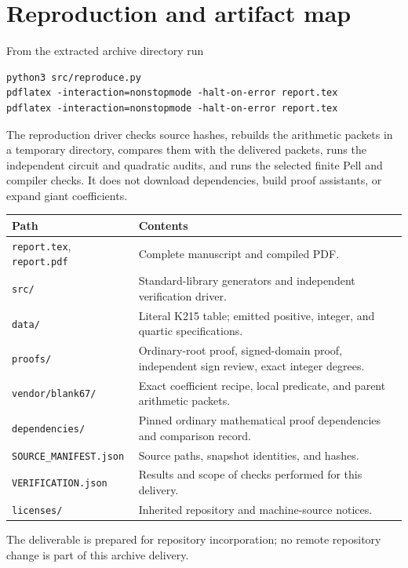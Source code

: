 \documentclass[11pt,a4paper]{article}
\theoremstyle{remark}\newtheorem{remark}[theorem]{Remark}
\newcommand{\src}[1]{\nolinkurl{#1}}
\begin{document}
\section{Reproduction and artifact map}
From the extracted archive directory run
\begin{lstlisting}
python3 src/reproduce.py
pdflatex -interaction=nonstopmode -halt-on-error report.tex
pdflatex -interaction=nonstopmode -halt-on-error report.tex
\end{lstlisting}
The reproduction driver checks source hashes, rebuilds the arithmetic
packets in a temporary directory, compares them with the delivered
packets, runs the independent circuit and quadratic audits, and runs
the selected finite Pell and compiler checks. It does not download
dependencies, build proof assistants, or expand giant coefficients.
\begin{center}\small
\begin{tabular}{p{53mm}p{93mm}}
\toprule
Path & Contents\\
\midrule
\src{report.tex}, \src{report.pdf} & Complete manuscript and compiled PDF.\\
\src{src/} & Standard-library generators and independent verification driver.\\
\src{data/} & Literal K215 table; emitted positive, integer, and quartic specifications.\\
\src{proofs/} & Ordinary-root proof, signed-domain proof, independent sign review, exact integer degrees.\\
\src{vendor/blank67/} & Exact coefficient recipe, local predicate, and parent arithmetic packets.\\
\src{dependencies/} & Pinned ordinary mathematical proof dependencies and comparison record.\\
\src{SOURCE_MANIFEST.json} & Source paths, snapshot identities, and hashes.\\
\src{VERIFICATION.json} & Results and scope of checks performed for this delivery.\\
\src{licenses/} & Inherited repository and machine-source notices.\\
\bottomrule
\end{tabular}
\end{center}
The deliverable is prepared for repository incorporation; no remote
repository change is part of this archive delivery.
\end{document}

